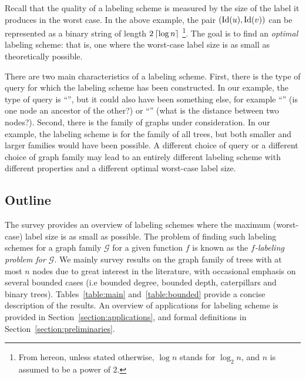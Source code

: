 Recall that the quality of a labeling scheme is measured by the size of the label it produces in the worst case.
In the above example, the pair $(\operatorname{Id}(u),\operatorname{Id}(v))$ can be represented as a binary string of length $2\left\lceil{\log n}\right\rceil$ \footnote{From hereon, unless stated otherwise,  $\log n$ stands for $ \log_{2} n$, and $n$ is assumed to be a power of $2$.}. The  goal is to find an \emph{optimal} labeling scheme: that is, one where the worst-case label size is as small as theoretically possible.

There are two main characteristics of a labeling scheme. First, there is the type of query for which the labeling scheme has been constructed. In our example, the type of query is ``\adjacency'', but it could also have been something else, for example ``\ancestry'' (is one node an ancestor of the other?) or ``\distance'' (what is the distance between  two nodes?). Second, there is the family of graphs under consideration. In our example, the labeling scheme is for the family of all trees, but both smaller and larger families would have been possible. A different choice of query or a different choice of graph family may lead to an entirely different labeling scheme with different properties and a different optimal worst-case label size. 

\subsection{Outline}
The survey provides an overview of labeling schemes where the maximum (worst-case) label size is as small as possible.
The problem of finding such labeling schemes for a graph family $\mathcal{G}$  for a given function $f$ is known as the \emph{$f$-labeling problem for $\mathcal{G}$}.
We mainly survey results on  the graph family of trees with at most $n$ nodes due to great interest in the literature, with occasional emphasis on several bounded cases (i.e bounded degree, bounded depth, caterpillars and binary trees).
Tables~\ref{table:main} and~\ref{table:bounded} provide a concise description of the results.
An overview of applications for labeling scheme is provided in Section~\ref{section:applications}, and formal definitions in Section~\ref{section:preliminaries}.

